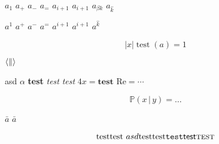 \documentclass{minimal}
\begin{document}
$a_1$
$a_+$
$a_-$
$a_=$
$a_{i + 1}$
$a_{i+1}$
$a_{\beta k}$
$a_{\hat k}$

$a^1$
$a^+$
$a^-$
$a^=$
$a^{i + 1}$
$a^{i+1}$
$a^{\hat k}$

\begin{equation}
  \bigl\lvert x \bigr\rvert
  \operatorname{test}(a) = 1
\end{equation}

$\langle \| \\ \rangle$

\textup{asd $\alpha$}
\textbf{test}
\textit{test}
\textsl{test}
$4 \mathit{x} = \mathbf{test}$
$\mathrm{Re} = \cdots$

\begin{equation}
  \mathbb{P}(x \,|\, y) \!= \dots
\end{equation}

$\bar a$
$\bar{a}$

\begin{equation}
  \text{test}
  \textnormal{test $asd$}
  \textrm{test}
  \textup{test}
  \texttt{test}
  \textsf{test}
  \textsc{test}
\end{equation}
\end{document}
